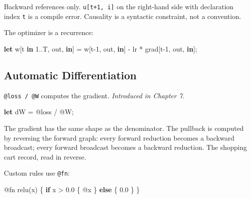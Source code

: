 \documentclass[11pt,titlepage]{article}
\newenvironment{Shaded}{}{}
\newcommand{\DecValTok}[1]{\textcolor[rgb]{0.25,0.63,0.44}{#1}}
\newcommand{\KeywordTok}[1]{\textcolor[rgb]{0.00,0.44,0.13}{\textbf{#1}}}
\newcommand{\NormalTok}[1]{#1}
\newcommand{\OperatorTok}[1]{\textcolor[rgb]{0.40,0.40,0.40}{#1}}
\begin{document}
Backward references only. \texttt{u{[}t+1,\ i{]}} on the right-hand side
with declaration index \texttt{t} is a compile error. Causality is a
syntactic constraint, not a convention.

The optimizer is a recurrence:

\begin{Shaded}
\begin{Highlighting}[]
\KeywordTok{let}\NormalTok{ w}\OperatorTok{[}\NormalTok{t }\KeywordTok{in} \DecValTok{1.}\NormalTok{.T, out, }\KeywordTok{in}\OperatorTok{]}\NormalTok{ = w}\OperatorTok{[}\NormalTok{t-}\DecValTok{1}\NormalTok{, out, }\KeywordTok{in}\OperatorTok{]}\NormalTok{ - lr * grad}\OperatorTok{[}\NormalTok{t-}\DecValTok{1}\NormalTok{, out, }\KeywordTok{in}\OperatorTok{]}\NormalTok{;}
\end{Highlighting}
\end{Shaded}

\vspace{2em}

\hypertarget{automatic-differentiation}{%
\subsection{Automatic Differentiation}\label{automatic-differentiation}}

\texttt{@loss\ /\ @W} computes the gradient. \emph{Introduced in Chapter
7.}

\begin{Shaded}
\begin{Highlighting}[]
\KeywordTok{let}\NormalTok{ dW = @loss / @W;}
\end{Highlighting}
\end{Shaded}

The gradient has the same shape as the denominator. The pullback is
computed by reversing the forward graph: every forward reduction becomes
a backward broadcast; every forward broadcast becomes a backward
reduction. The shopping cart record, read in reverse.

Custom rules use \texttt{@fn}:

\begin{Shaded}
\begin{Highlighting}[]
\NormalTok{@fn relu(x) }\OperatorTok{\{}
    \KeywordTok{if}\NormalTok{ x > }\DecValTok{0.0} \OperatorTok{\{}\NormalTok{ @x }\OperatorTok{\}} \KeywordTok{else} \OperatorTok{\{} \DecValTok{0.0} \OperatorTok{\}}
\OperatorTok{\}}
\end{Highlighting}
\end{Shaded}
\end{document}
